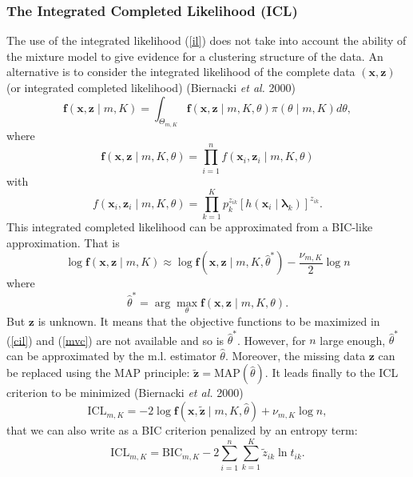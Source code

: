 \documentclass[12pt]{article}
\newcommand{\blambda}{\boldsymbol{\lambda}}
\begin{document}
\subsubsection{The Integrated Completed Likelihood (ICL)}
The use of the integrated likelihood (\ref{il}) does not take into account the ability of the
mixture model to give evidence for a clustering structure of the data.  An alternative is to
consider the integrated likelihood of the complete data $({\mathbf x}, {\mathbf z})$ (or
integrated completed likelihood) (Biernacki {\it et al.} 2000)
\begin{equation} \label{cil}
  {\mathbf f}({\mathbf x}, {\mathbf z} \mid
  m,K)=\int_{\Theta_{m,K}}{\mathbf f}({\mathbf x}, {\mathbf z} \mid
  m,K,\theta) \pi(\theta \mid m,K) d\theta,
\end{equation}
where
\begin{equation}
  {\mathbf f}({\mathbf x}, {\mathbf z} \mid m,K,\theta)=
  \prod_{i=1}^n f({\mathbf x}_i,{\mathbf z}_i \mid m,K,\theta)
\end{equation}
with
\begin{equation}
  f({\mathbf x}_i,{\mathbf z}_i \mid m,K,\theta)= \prod_{k=1}^K
  p_k^{z_{ik}}\left[h({\mathbf x}_i \mid {\blambda}_k)\right]^{z_{ik}}.
\end{equation}
This integrated completed likelihood can be approximated from a BIC-like approximation.
That is
\begin{equation}
  \log {\mathbf f}({\mathbf x},{\mathbf z} \mid m,K)\approx \log
  {\mathbf f}({\mathbf x},{\mathbf z} \mid m,K,\hat\theta^{*}) -
  \frac{\nu_{m,K}}{2} \log n
\end{equation}
where
\begin{equation} \label{mvc}
  \hat \theta^{*}=\arg \max_{\theta} {\mathbf f}({\mathbf
    x},{\mathbf z} \mid m,K,\theta).
\end{equation}
But ${\mathbf z}$ is unknown. It means that the objective functions to be maximized in
(\ref{cil}) and (\ref{mvc}) are not available and so is $\hat\theta^{*}$. However, for $n$
large enough, $\hat \theta^{*}$ can be approximated by the m.l. estimator
$\hat\theta$. Moreover, the missing data ${\mathbf z}$ can be replaced using the MAP principle:
$\mathbf {\tilde z}=\mbox{MAP}(\hat \theta)$. It leads finally to the ICL criterion to be
minimized (Biernacki {\it et al.}  2000)
\begin{equation} \label{icl}
  \mbox{ICL}_{m,K}= -2\log {\mathbf f}({\mathbf x}, \tilde {\mathbf
    z} \mid m,K,\hat \theta) + \nu_{m,K} \log n,
\end{equation}
that we can also write as a BIC criterion penalized by an entropy term:
\begin{equation} \label{icl2}
  \mbox{ICL}_{m,K}= \mbox{BIC}_{m,K} - 2\sum_{i=1}^n\sum_{k=1}^K
  \tilde z_{ik}\ln t_{ik}.
\end{equation}
\end{document}
